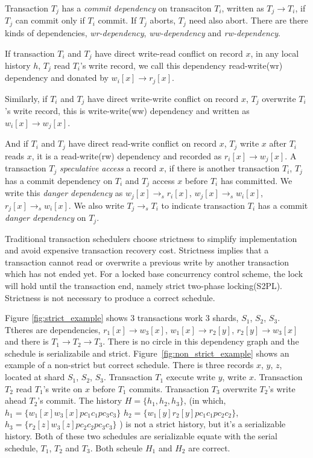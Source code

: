 \documentclass[conference]{IEEEtran}
\begin{document}
Transaction ${T_j}$ has a \emph{commit dependency} on transaciton ${T_i}$, written as ${T_j \rightarrow T_i}$, if ${T_j}$ can commit only if ${T_i}$ commit. 
If ${T_j}$ aborts, ${T_j}$ need also abort.
There are there kinds of dependencies, \emph{wr-dependency}, \emph{ww-dependency} and \emph{rw-dependency}.

If transaction ${T_i}$ and ${T_j}$ have direct write-read conflict on record ${x}$, in any local history ${h}$, ${T_j}$ read ${T_i}$'s write record,
we call this dependency read-write(wr) dependency and donated by ${w_i[x] \rightarrow r_j[x]}$.

Similarly, if ${T_i}$ and ${T_j}$ have direct write-write conflict on record ${x}$, ${T_j}$ overwrite ${T_i}$'s write record, this is  write-write(ww) dependency and written as ${w_i[x] \rightarrow w_j[x]}$.

And if ${T_i}$ and ${T_j}$ have direct read-write conflict on record ${x}$, ${T_j}$ write ${x}$ after ${T_i}$ reads ${x}$, it is a read-write(rw) dependency and recorded as ${r_i[x] \rightarrow w_j[x]}$. 
A transaction ${T_j}$ \emph{speculative access} a record ${x}$, if there is another transaction ${T_i}$, 
${T_j}$ has a commit dependency on ${T_i}$ and ${T_j}$ access ${x}$ before ${T_i}$ has committed.
We write this \emph{danger dependency} as ${w_j[x] \rightarrow_s r_i[x]}$, ${w_j[x] \rightarrow_s w_i[x]}$, 
${r_j[x] \rightarrow_s w_i[x]}$.
We also write ${T_j \rightarrow_s T_i}$ to indicate transaction ${T_i}$ has a commit \emph{danger dependency} on ${T_j}$. 


Traditional transaction schedulers choose strictness\cite{DBLP:conf/vldb/Raz92} to simplify implementation and avoid expensive transaction recovery cost.
Strictness implies that a transaction cannot read or overwrite a previous write by another transaction which has not ended yet.
For a locked base concurrency control scheme, the lock will hold until the transaction end, namely strict two-phase locking(S2PL).
Strictness is not necessary to produce a correct schedule.


Figure \ref{fig:strict_example} shows 3 transactions work 3 shards, ${S_1}$, ${S_2}$, ${S_3}$.
Ttheres are dependencies, ${r_1[x] \rightarrow w_3[x]}$, ${w_1[x] \rightarrow r_2[y]}$, ${r_2[y] \rightarrow w_3[x]}$ and there is ${T_1 \rightarrow T_2 \rightarrow T_3}$.
There is no circle in this dependency graph and the schedule is serializabile and strict. 
Figure~\ref{fig:non_strict_example} shows an example of a non-strict but correct schedule.
There is three records ${x}$, ${y}$, ${z}$, located at shard ${S_1}$, ${S_2}$, ${S_3}$.
Transaction ${T_1}$ execute write ${y}$, write ${x}$.
Transaction ${T_2}$ read ${T_1}$'s write on ${x}$ before ${T_1}$ commits.
Transaction ${T_3}$ overwrite ${T_2}$'s write ahead ${T_2}$'s commit.
The history ${H = \{h_1, h_2, h_3\}}$,
(in which, ${h_1=\{w_1[x]w_3[x]pc_1c_1pc_3c_3\}}$
${h_2=\{w_1[y]r_2[y]pc_1c_1pc_2c_2\}}$, 
${h_3=\{r_2[z]w_3[z]pc_2c_2pc_3c_3\} }$ )
is not a strict history, but it's a serializable history. 
Both of these two schedules are serializable equate with the serial schedule, ${T_1}$, ${T_2}$ and ${T_3}$.
Both scheule ${H_1}$ and ${H_2}$ are correct.
\end{document}
